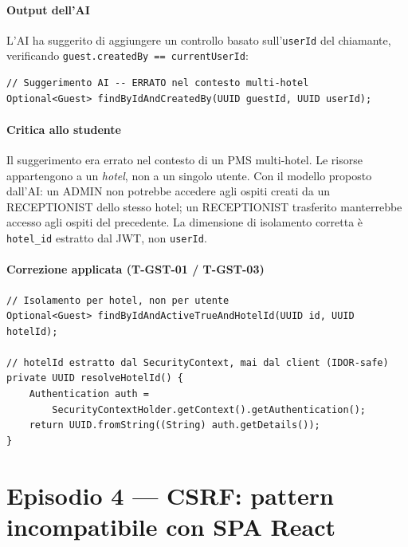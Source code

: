﻿\documentclass[a4paper,12pt]{report}
\begin{document}
\paragraph{Output dell'AI}
L'AI ha suggerito di aggiungere un controllo basato sull'\texttt{userId} del
chiamante, verificando \texttt{guest.createdBy == currentUserId}:
\begin{lstlisting}[style=java]
// Suggerimento AI -- ERRATO nel contesto multi-hotel
Optional<Guest> findByIdAndCreatedBy(UUID guestId, UUID userId);
\end{lstlisting}

\paragraph{Critica allo studente}
Il suggerimento era errato nel contesto di un PMS multi-hotel.
Le risorse appartengono a un \emph{hotel}, non a un singolo utente.
Con il modello proposto dall'AI: un ADMIN non potrebbe accedere agli ospiti
creati da un RECEPTIONIST dello stesso hotel; un RECEPTIONIST trasferito
manterrebbe accesso agli ospiti del precedente. La dimensione di isolamento
corretta è \texttt{hotel\_id} estratto dal JWT, non \texttt{userId}.

\paragraph{Correzione applicata (T-GST-01 / T-GST-03)}

\begin{securebox}[title={Isolamento per hotel\_id (T-GST-01, OWASP A01)}]
\begin{lstlisting}[style=java]
// Isolamento per hotel, non per utente
Optional<Guest> findByIdAndActiveTrueAndHotelId(UUID id, UUID hotelId);

// hotelId estratto dal SecurityContext, mai dal client (IDOR-safe)
private UUID resolveHotelId() {
    Authentication auth =
        SecurityContextHolder.getContext().getAuthentication();
    return UUID.fromString((String) auth.getDetails());
}
\end{lstlisting}
\end{securebox}

\section{Episodio 4 --- CSRF: pattern incompatibile con SPA React}
\end{document}
